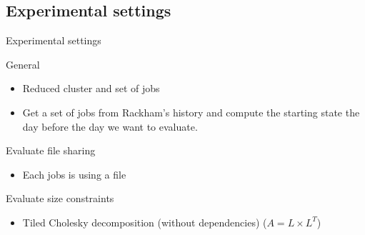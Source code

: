 \documentclass{libs/ufc_format}
\begin{document}
{\subsection{Experimental settings}
\begin{frame}{Experimental settings}
        \begin{block}{General}
            \begin{itemize}
				\item Reduced cluster and set of jobs
				\item Get a set of jobs from Rackham's history and compute the starting state the day before the day we want to evaluate.
			\end{itemize}
        \end{block}
        \begin{block}{Evaluate file sharing}
            \begin{itemize}
				\item Each jobs is using a file
			\end{itemize}
		\end{block}
			\begin{block}{Evaluate size constraints}
			\begin{itemize}
				\item Tiled Cholesky decomposition (without dependencies) ($A = L \times L^T$)
			\end{itemize}
			\end{block}
\end{frame}

}
\end{document}

